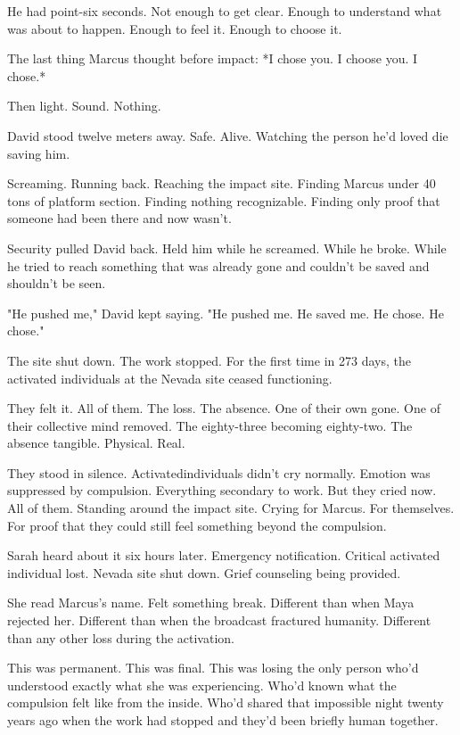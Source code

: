 He had point-six seconds. Not enough to get clear. Enough to understand what was about to happen. Enough to feel it. Enough to choose it.

The last thing Marcus thought before impact: *I chose you. I choose you. I chose.*

Then light. Sound. Nothing.

\scenebreak

David stood twelve meters away. Safe. Alive. Watching the person he'd loved die saving him.

Screaming. Running back. Reaching the impact site. Finding Marcus under 40 tons of platform section. Finding nothing recognizable. Finding only proof that someone had been there and now wasn't.

Security pulled David back. Held him while he screamed. While he broke. While he tried to reach something that was already gone and couldn't be saved and shouldn't be seen.

"He pushed me," David kept saying. "He pushed me. He saved me. He chose. He chose."

The site shut down. The work stopped. For the first time in 273 days, the activated individuals at the Nevada site ceased functioning.

They felt it. All of them. The loss. The absence. One of their own gone. One of their collective mind removed. The eighty-three becoming eighty-two. The absence tangible. Physical. Real.

They stood in silence. Activatedindividuals didn't cry normally. Emotion was suppressed by compulsion. Everything secondary to work. But they cried now. All of them. Standing around the impact site. Crying for Marcus. For themselves. For proof that they could still feel something beyond the compulsion.

\scenebreak

Sarah heard about it six hours later. Emergency notification. Critical activated individual lost. Nevada site shut down. Grief counseling being provided.

She read Marcus's name. Felt something break. Different than when Maya rejected her. Different than when the broadcast fractured humanity. Different than any other loss during the activation.

This was permanent. This was final. This was losing the only person who'd understood exactly what she was experiencing. Who'd known what the compulsion felt like from the inside. Who'd shared that impossible night twenty years ago when the work had stopped and they'd been briefly human together.

